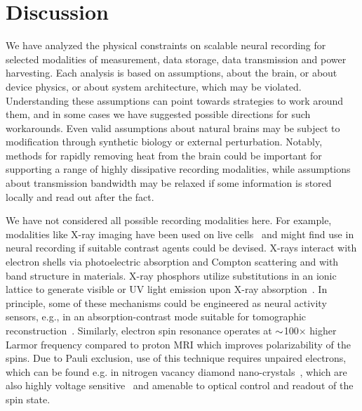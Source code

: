 \section{Discussion}

We have analyzed the physical constraints on scalable neural recording for selected modalities of measurement, data storage, data transmission and power harvesting.
Each analysis is based on assumptions, about the brain, or about device physics, or about system architecture, which may be violated.
Understanding these assumptions can point towards strategies to work around them, and in some cases we have suggested possible directions for such workarounds.
Even valid assumptions about natural brains may be subject to modification through synthetic biology or external perturbation.
Notably, methods for rapidly removing heat from the brain could be important for supporting a range of highly dissipative recording modalities, while assumptions about transmission bandwidth may be relaxed if some information is stored locally and read out after the fact.

We have not considered all possible recording modalities here.
For example, modalities like X-ray imaging have been used on live cells~\cite{moosmann13} and might find use in neural recording if suitable contrast agents could be devised.
X-rays interact with electron shells via photoelectric absorption and Compton scattering and with band structure in materials.
X-ray phosphors utilize substitutions in an ionic lattice to generate visible or UV light emission upon X-ray absorption~\cite{issler95}.
In principle, some of these mechanisms could be engineered as neural activity sensors, e.g., in an absorption-contrast mode suitable for tomographic reconstruction~\cite{larabell04}.
Similarly, electron spin resonance operates at ${\sim}$100$\times$ higher Larmor frequency compared to proton MRI which improves polarizability of the spins.
Due to Pauli exclusion, use of this technique requires unpaired electrons, which can be found e.g. in nitrogen vacancy diamond nano-crystals~\cite{horowitz12}, which are also highly voltage sensitive~\cite{dolde11} and amenable to optical control and readout of the spin state.

